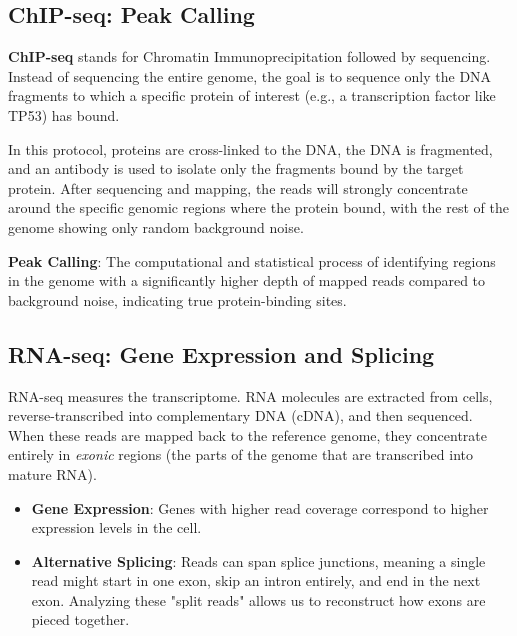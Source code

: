 \subsection{ChIP-seq: Peak Calling}

\textbf{ChIP-seq} stands for Chromatin Immunoprecipitation followed by sequencing. Instead of sequencing the entire genome, the goal is to sequence only the DNA fragments to which a specific protein of interest (e.g., a transcription factor like TP53) has bound.

In this protocol, proteins are cross-linked to the DNA, the DNA is fragmented, and an antibody is used to isolate only the fragments bound by the target protein. After sequencing and mapping, the reads will strongly concentrate around the specific genomic regions where the protein bound, with the rest of the genome showing only random background noise. 

\begin{important}
  \textbf{Peak Calling}: The computational and statistical process of identifying regions in the genome with a significantly higher depth of mapped reads compared to background noise, indicating true protein-binding sites.
\end{important}

\subsection{RNA-seq: Gene Expression and Splicing}

RNA-seq measures the transcriptome. RNA molecules are extracted from cells, reverse-transcribed into complementary DNA (cDNA), and then sequenced. When these reads are mapped back to the reference genome, they concentrate entirely in \textit{exonic} regions (the parts of the genome that are transcribed into mature RNA).

\begin{itemize}
  \item \textbf{Gene Expression}: Genes with higher read coverage correspond to higher expression levels in the cell.
  \item \textbf{Alternative Splicing}: Reads can span splice junctions, meaning a single read might start in one exon, skip an intron entirely, and end in the next exon. Analyzing these "split reads" allows us to reconstruct how exons are pieced together.
\end{itemize}


